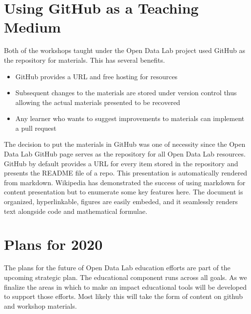 \section{Using GitHub as a Teaching Medium}
\label{githubforteaching}
Both of the workshops taught under the Open Data Lab project used GitHub as the repository for materials. This has several benefits.
\begin{itemize}
\item GitHub provides a URL and free hosting for resources
\item Subsequent changes to the materials are stored under version control thus allowing the actual materials presented to be recovered
\item Any learner who wants to suggest improvements to materials can implement a pull request
\end{itemize}

The decision to put the materials in GitHub was one of necessity since the Open Data Lab GitHub page serves as the repository for all Open Data Lab resources. GitHub by default provides a URL for every item stored in the repository and presents the README file of a repo. This presentation is automatically rendered from markdown. Wikipedia has demonstrated the success of using markdown for content presentation but to enumerate some key features here. The document is organized, hyperlinkable, figures are easily embeded, and it seamlessly renders text alongside code and mathematical formulae.

\section{Plans for 2020}
The plans for the future of Open Data Lab education efforts are part of the upcoming strategic plan. The educational component runs across all goals. As we finalize the areas in which to make an impact educational tools will be developed to support those efforts. Most likely this will take the form of content on github and workshop materials.